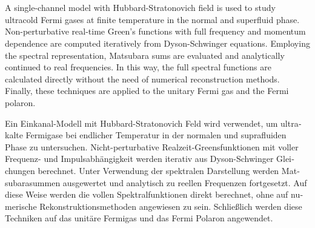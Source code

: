 {\hypersetup{allcolors=black}
\thispagestyle{plain}

\makeatletter

\begin{center}
\textbf{\Large\@title} \\
\vspace{.1cm}
\@author \\
\end{center}

\makeatother

\vspace*{1cm}

A single-channel model with Hubbard-Stratonovich field is used to study ultracold Fermi gases at finite temperature in the normal and superfluid phase. Non-perturbative real-time Green's functions with full frequency and momentum dependence are computed iteratively from Dyson-Schwinger equations. Employing the spectral representation, Matsubara sums are evaluated and analytically continued to real frequencies. In this way, the full spectral functions are calculated directly without the need of numerical reconstruction methods. Finally, these techniques are applied to the unitary Fermi gas and the Fermi polaron.

\vfill

\begin{otherlanguage}{ngerman}
Ein Einkanal-Modell mit Hubbard-Stratonovich Feld wird verwendet, um ultrakalte Fermi\-gase bei endlicher Temperatur in der normalen und suprafluiden Phase zu untersuchen. Nicht-perturbative Realzeit-Greensfunktionen mit voller Frequenz- und Impulsabhängigkeit werden iterativ aus Dyson-Schwinger Gleichungen berechnet. Unter Verwendung der spektralen Darstellung werden Matsubarasummen ausgewertet und analytisch zu reellen Frequenzen fortgesetzt. Auf diese Weise werden die vollen Spektralfunktionen direkt berechnet, ohne auf numerische Rekonstruktionsmethoden angewiesen zu sein. Schließlich werden diese Techniken auf das unitäre Fermigas und das Fermi Polaron angewendet.
\end{otherlanguage}
\vfill
}